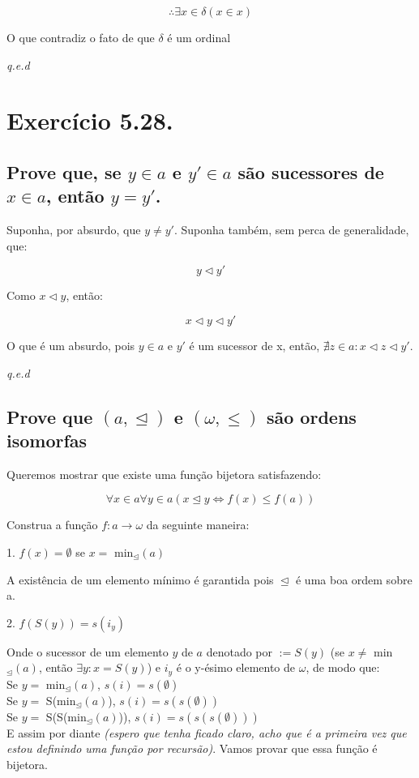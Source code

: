 \documentclass[12pt]{extarticle}
\newcommand{\fim}{\begin{flushright}

   \emph{q.e.d}
\end{flushright}}
\begin{document}
$$
\therefore \exists x \in \delta (x \in x)
$$

O que contradiz o fato de que $\delta$ é um ordinal

\fim

\section{Exercício 5.28.}

\subsection{Prove que, se $y \in a$ e $y'\in a$ são sucessores de $x \in a$, então $y = y'$.}

Suponha, por absurdo, que $y \neq y'$. Suponha também, sem perca de generalidade, que:


$$
y \triangleleft y'
$$

Como $x \triangleleft y$, então:

$$
x \triangleleft y \triangleleft y'
$$

O que é um absurdo, pois $y \in a$ e $y'$ é um sucessor de x, então, $\nexists z \in a : x \triangleleft z \triangleleft y'$.

\fim

\subsection{Prove que $(a, \trianglelefteq)$ e $(\omega, \leq)$ são ordens isomorfas}

Queremos mostrar que existe uma função bijetora satisfazendo:

$$
\forall x \in a \forall y \in a (x \trianglelefteq y \Leftrightarrow f(x) \leq f(a))
$$

Construa a função $f: a \rightarrow \omega$ da seguinte maneira:

1. $f(x) = \emptyset$ se $x =$ min$_{\trianglelefteq}(a)$

A existência de um elemento mínimo é garantida pois $\trianglelefteq$ é uma boa ordem sobre a.

2. $f(S(y)) = s(i_y)$

Onde o sucessor de um elemento $y$ de $a$ denotado por $ := S(y)$ (se $x \neq$ min$_{\trianglelefteq}(a)$, então $\exists y : x = S(y)$) e $i_y$ é o y-ésimo elemento de $\omega$, de modo que:
\\
Se $y = $ min$_{\trianglelefteq}(a)$, $s(i) = s(\emptyset)$ \\
Se $y =$ S(min$_{\trianglelefteq}(a)$), $s(i) = s(s(\emptyset))$\\
Se $y =$ S(S(min$_{\trianglelefteq}(a)$)), $s(i) = s(s(s(\emptyset)))$\\
E assim por diante \textit{(espero que tenha ficado claro, acho que é a primeira vez que estou definindo uma função por recursão)}. Vamos provar que essa função é bijetora.
\end{document}
